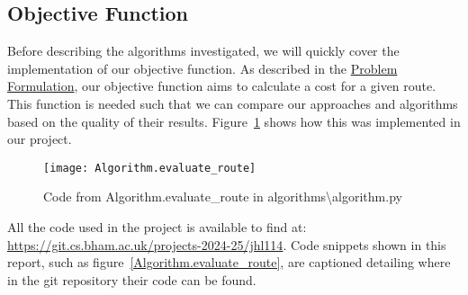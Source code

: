 
\subsection{Objective Function}\label{subsec:algorithms-objective-function}
Before describing the algorithms investigated, we will quickly cover the implementation of our objective function.
As described in the \hyperref[sec:problem-formulation]{Problem Formulation}, our objective function aims to
calculate a cost for a given route.
This function is needed such that we can compare our approaches and algorithms based on the quality of their results.
Figure~\ref{fig:Algorithm.evaluate_route} shows how this was implemented in our project.
\begin{figure}[H]
    \centering
    \texttt{[image: Algorithm.evaluate\_route]}
    \caption{Code from Algorithm.evaluate\_route in algorithms\textbackslash algorithm.py}
    \label{fig:Algorithm.evaluate_route}
\end{figure}

\noindent
All the code used in the project is available to find at: \url{https://git.cs.bham.ac.uk/projects-2024-25/jhl114}.
Code snippets shown in this report, such as figure~\ref{Algorithm.evaluate_route}, are captioned
detailing where in the git repository their code can be found.

